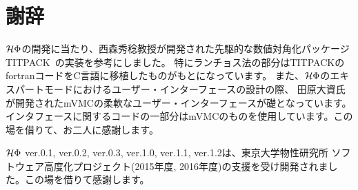 \chapter{謝辞}
\label{Ch:ack}
$\mathcal{H} \Phi$の開発に当たり、西森秀稔教授が開発された先駆的な数値対角化パッケージTITPACK~\cite{titpack}の実装を参考にしました。
特にランチョス法の部分はTITPACKのfortranコードをC言語に移植したものがもとになっています。
また、$\mathcal{H} \Phi$のエキスパートモードにおけるユーザー・インターフェースの設計の際、
田原大資氏が開発されたmVMCの柔軟なユーザー・インターフェースが礎となっています。
インタフェースに関するコードの一部分はmVMCのものを使用しています。この場を借りて、お二人に感謝します。

$\mathcal{H} \Phi$ ver.0.1, ver.0.2, ver.0.3, ver.1.0, ver.1.1, ver.1.2は、東京大学物性研究所 ソフトウェア高度化プロジェクト(2015年度, 2016年度)の支援を受け開発されました。この場を借りて感謝します。
